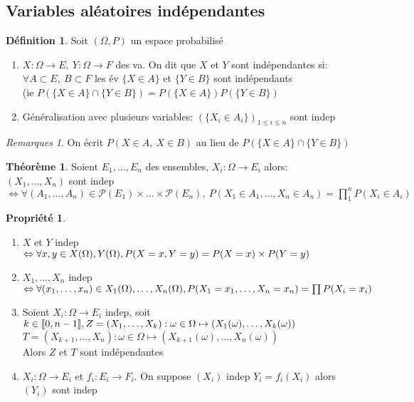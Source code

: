 \documentclass[fleqn]{article}
\theoremstyle{definition} \newtheorem*{defi}{D\'efinition}
\theoremstyle{definition} \newtheorem*{theo}{Th\'eor\`eme}
\theoremstyle{definition} \newtheorem*{coro}{Corollaire}
\theoremstyle{remark} \newtheorem*{rqs}{Remarques}
\theoremstyle{definition} \newtheorem*{prop}{Propri\'et\'e}
\begin{document}
\subsection{Variables al\'eatoires ind\'ependantes}
\begin{defi} Soit $(\Omega, P)$ un espace probabilis\'e
	\begin{enumerate}
		\item $X: \Omega \rightarrow E,\ Y: \Omega \rightarrow F$ des va. On dit que $X$ et $Y$ sont ind\'ependantes si:\\ $\forall A \subset E,\
		B \subset F$ les \'ev $\{X \in A\}$ et $\{Y \in B\}$ sont ind\'ependants \\(ie $P(\{X\in A\} \cap \{Y \in B\}) = P(\{X\in A\})
		P(\{Y \in B\})$
		\item G\'en\'eralisation avec plusieurs variables: $(\{X_i \in A_i\})_{1 \leq i \leq n}$ sont indep
	\end{enumerate}
	\begin{rqs}
			On \'ecrit $P(X \in A,\ X \in B)$ au lieu de $P(\{X \in A\} \cap \{Y \in B\})$
	\end{rqs}
\end{defi}

\begin{theo}
	Soient $E_1, \hdots, E_n$ des ensembles, $X_i: \Omega \rightarrow E_i$ alors:\\
	$(X_1, \hdots, X_n)$ sont indep $\Leftrightarrow \forall (A_1, \hdots, A_n) \in \mathcal{P}(E_1) \times \hdots \times \mathcal{P}(E_n),\
	P(X_1 \in A_1, \hdots, X_n \in A_n) = \prod_1^n P(X_i \in A_i)$
\end{theo}

\begin{prop} $ $
	\begin{enumerate}
		\item $X$ et $Y$ indep $\Leftrightarrow \forall x,y \in X(\Omega),Y(\Omega),\\ P(X=x, Y=y) = P(X=x)\times P(Y=y)$
		\item $X_1, \hdots, X_n$ indep $\Leftrightarrow \forall (x_1, \hdots, x_n) \in X_1(\Omega), \hdots, X_n(\Omega),\\ P(X_1=x_1, \hdots,
			X_n = x_n) = \prod P(X_i = x_i)$
		\item Soient $X_i: \Omega \rightarrow E_i$ indep, soit $k \in [\![0,n-1]\!],\\ Z=(X_1, \hdots, X_k): \omega \in \Omega \mapsto
			(X_1(\omega), \hdots, X_k(\omega))$\\
			$T= (X_{k+1}, \hdots, X_n): \omega \in \Omega \mapsto (X_{k+1}(\omega), \hdots, X_n(\omega))$\\
			Alors $Z$ et $T$ sont ind\'ependantes
		\item $X_i: \Omega \rightarrow E_i$ et $f_i : E_i \rightarrow F_i$. On suppose $(X_i)$ indep $Y_i = f_i(X_i)$ alors $(Y_i)$ sont indep
	\end{enumerate}
\end{prop}
\end{document}
